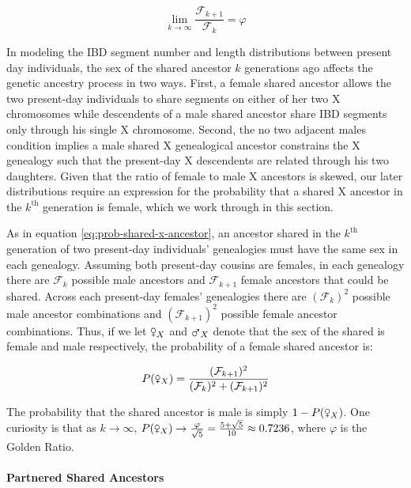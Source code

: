 \documentclass[9pt,twocolumn,twoside]{gsajnl}
\newcommand{\msxa}{\mars_X}
\newcommand{\fsxa}{\venus_X}
\begin{document}
\begin{equation}
  \lim_{k \to \infty} \frac{\mathcal{F}_{k+1}}{\mathcal{F}_k} = \varphi
\end{equation}

In modeling the IBD segment number and length distributions between present day
individuals, the sex of the shared ancestor $k$ generations ago affects the
genetic ancestry process in two ways. First, a female shared ancestor allows
the two present-day individuals to share segments on either of her two X
chromosomes while descendents of a male shared ancestor share IBD segments only
through his single X chromosome. Second, the no two adjacent males condition
implies a male shared X genealogical ancestor constrains the X genealogy such
that the present-day X descendents are related through his two daughters.
Given that the ratio of female to male X ancestors is skewed, our later
distributions require an expression for the probability that a shared X
ancestor in the $k^\text{th}$ generation is female, which we work through in
this section.

As in equation \eqref{eq:prob-shared-x-ancestor}, an ancestor shared in the
$k^\text{th}$ generation of two present-day individuals' genealogies must have
the same sex in each genealogy. Assuming both present-day cousins are females,
in each genealogy there are $\mathcal{F}_k$ possible male ancestors and
$\mathcal{F}_{k+1}$ female ancestors that could be shared. Across each
present-day females' genealogies there are $(\mathcal{F}_k)^2$ possible male
ancestor combinations and $(\mathcal{F}_{k+1})^2$ possible female ancestor
combinations. Thus, if we let $\fsxa$ and $\msxa$ denote that the sex of the
shared is female and male respectively, the probability of a female shared
ancestor is: 

\begin{equation}
  P(\fsxa) = \frac{(\mathcal{F}_{k+1})^2}{(\mathcal{F}_k)^2 + (\mathcal{F}_{k+1})^2}
\end{equation}

The probability that the shared ancestor is male is simply $1-P(\fsxa)$. One
curiosity is that as $k \to \infty$, $P(\fsxa) \to \frac{\varphi}{\sqrt{5}} =
\frac{5 + \sqrt{5}}{10} \approx 0.7236$, where $\varphi$ is the Golden Ratio.

\paragraph{Partnered Shared Ancestors}
\end{document}
